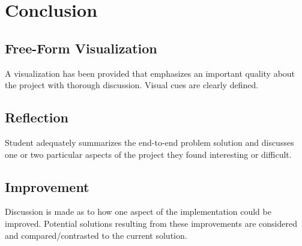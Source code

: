 \documentclass[a4paper,10pt,fleqn]{article}
\begin{document}
\section{Conclusion}
\subsection{Free-Form Visualization}
A visualization has been provided that emphasizes an important quality about the project with thorough discussion. Visual cues are clearly defined.

\subsection{Reflection}
Student adequately summarizes the end-to-end problem solution and discusses one or two particular aspects of the project they found interesting or difficult.

\subsection{Improvement}
Discussion is made as to how one aspect of the implementation could be improved. Potential solutions resulting from these improvements are considered and compared/contrasted to the current solution.
\end{document}

